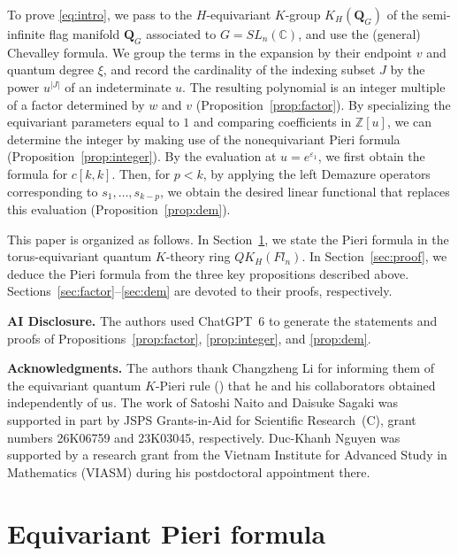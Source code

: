 \documentclass[11pt,a4paper,reqno]{amsart}
\DeclareRobustCommand{\rev}[1]{{\color{revision}#1}}
\numberwithin{equation}{section}
\theoremstyle{definition}
\newcommand{\Z}{\mathbb Z}
\newcommand{\C}{\mathbb C}
\newcommand{\QG}{\mathbf Q_G}
\newcommand{\eps}{\varepsilon}
\begin{document}
\rev{To prove \eqref{eq:intro}, we pass to the \(H\)-equivariant \(K\)-group \(K_{H}(\QG)\) of the semi-infinite flag manifold \(\QG\) associated to \(G = SL_{n}(\C)\), and use the (general) Chevalley formula. We group the terms in the expansion by their endpoint \(v\) and quantum degree \(\xi\), and record the cardinality of the indexing subset \(J\) by the power \(u^{|J|}\) of an indeterminate \(u\). The resulting polynomial is an integer multiple of a factor determined by \(w\) and \(v\) (Proposition~\ref{prop:factor}). By specializing the equivariant parameters equal to \(1\) and comparing coefficients in \(\Z[u]\), we can determine the integer by making use of the nonequivariant Pieri formula (Proposition~\ref{prop:integer}). By the evaluation at \(u=e^{\eps_1}\), we first obtain the formula for \(c[k,k]\). Then, for \(p<k\), by applying the left Demazure operators corresponding to \(s_1,\ldots,s_{k-p}\), we obtain the desired linear functional that replaces this evaluation (Proposition~\ref{prop:dem}).}

\rev{This paper is organized as follows. In Section~\ref{sec:pieri}, we state the Pieri formula in the torus-equivariant quantum \(K\)-theory ring \(QK_H(Fl_n)\). In Section~\ref{sec:proof}, we deduce the Pieri formula from the three key propositions described above. Sections~\ref{sec:factor}--\ref{sec:dem} are devoted to their proofs, respectively.}

\smallskip
\noindent\textbf{AI Disclosure.}\enspace
The authors used ChatGPT~6 to generate the statements and proofs of
Propositions~\ref{prop:factor}, \ref{prop:integer}, and \ref{prop:dem}.

\smallskip
\noindent\textbf{Acknowledgments.}\enspace
The authors thank Changzheng Li for informing them of the equivariant quantum
\(K\)-Pieri rule (\cite{FGLX}) that he and his collaborators obtained independently of us.
The work of Satoshi Naito and Daisuke Sagaki was supported in part by JSPS
Grants-in-Aid for Scientific Research~(C), grant numbers 26K06759 and
23K03045, respectively.
Duc-Khanh Nguyen was supported by a research grant from the Vietnam Institute
for Advanced Study in Mathematics (VIASM) during his postdoctoral appointment there.

\section{Equivariant Pieri formula}\label{sec:pieri}
\end{document}
